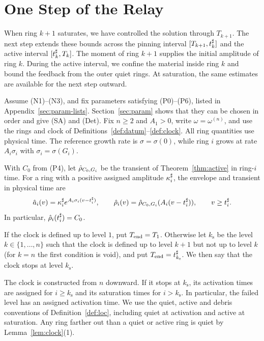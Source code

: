 \section{One Step of the Relay}
\label{sec:relay}

When ring $k+1$ saturates, we have controlled the solution through
$T_{k+1}$. The next step extends these bounds across the pinning interval
$[T_{k+1},t^\sharp_k]$ and the active interval $[t^\sharp_k,T_k]$. The moment of ring
$k+1$ supplies the initial amplitude of ring $k$. During the active interval,
we confine the material inside ring $k$ and bound the feedback from the outer
quiet rings. At saturation, the same estimates are available for the next
step outward.

Assume (N1)--(N3), and fix parameters satisfying (P0)--(P6), listed in
Appendix~\ref{sec:param-lists}. Section~\ref{sec:param} shows that they can
be chosen in order and give (SA) and (Det). Fix $n\ge2$ and $A_1>0$, write
$\omega=\omega^{(n)}$, and use the rings and clock of
Definitions~\ref{def:datum}--\ref{def:clock}. All ring quantities use physical
time. The reference growth rate is $\sigma=\sigma(0)$, while ring $i$ grows
at rate $A_i\sigma_i$ with $\sigma_i=\sigma(G_i)$.

With $C_0$ from (P4), let $\hat\rho_{C_0,G_i}$ be the transient of
Theorem~\ref{thm:active} in ring-$i$ time. For a ring with a positive
assigned amplitude $\kappa^\sharp_i$, the envelope and transient in physical time are
\begin{equation}
\label{eq:relay-envelope}
\hat a_i(v)=\kappa^\sharp_i e^{A_i\sigma_i(v-t^\sharp_i)},\qquad
\hat\rho_i(v)=\hat\rho_{C_0,G_i}(A_i(v-t^\sharp_i)),\qquad v\ge t^\sharp_i.
\end{equation}
In particular, $\hat\rho_i(t^\sharp_i)=C_0$.

\begin{definition}
\label{def:stop}
If the clock is defined up to level $1$, put $T_{\mathrm{end}}=T_1$. Otherwise let
$k_{\mathrm s}$ be the level $k\in\{1,\dots,n\}$ such that the clock is defined up
to level $k+1$ but not up to level $k$ (for $k=n$ the first condition is void),
and put $T_{\mathrm{end}}=t^\sharp_{k_{\mathrm s}}$. We then say that the clock stops at
level $k_{\mathrm s}$.
\end{definition}

The clock is constructed from $n$ downward. If it stops at $k_{\mathrm s}$,
its activation times are assigned for $i\ge k_{\mathrm s}$ and its saturation
times for $i>k_{\mathrm s}$. In particular, the failed level has an assigned
activation time. We use the quiet, active and debris conventions of
Definition~\ref{def:loc}, including quiet at activation and active at
saturation. Any ring farther out than a quiet or active ring is quiet by
Lemma~\ref{lem:clock}(1).

